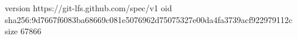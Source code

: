 version https://git-lfs.github.com/spec/v1
oid sha256:9d7667f6083ba68669c081e5076962d75075327e00da4fa3739acf922979112c
size 67866
